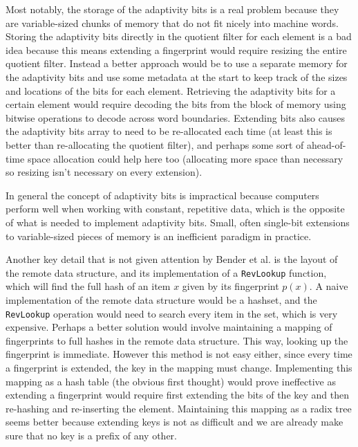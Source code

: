 \documentclass[../paper.tex]{subfiles}
\begin{document}
Most notably, the storage of the adaptivity bits is a real problem
because they are variable-sized chunks of memory that
do not fit nicely into machine words. Storing the adaptivity
bits directly in the quotient filter for each element is a bad idea
because this means extending a fingerprint would require resizing
the entire quotient filter. Instead a better approach would be
to use a separate memory for the adaptivity bits and use some metadata
at the start to keep track of the sizes and locations of the bits for each element. Retrieving
the adaptivity bits for a certain element would require decoding the bits
from the block of memory using bitwise operations to decode across word boundaries.
Extending bits also causes the adaptivity bits array to need to be re-allocated
each time (at least this is better than re-allocating the quotient filter), and
perhaps some sort of ahead-of-time space allocation could help here too (allocating more space than
necessary so resizing isn't necessary on every extension).

In general the concept of adaptivity bits is impractical because computers perform
well when working with constant, repetitive data, which is the opposite
of what is needed to implement adaptivity bits. Small, often single-bit
extensions to variable-sized pieces of memory is an inefficient paradigm
in practice.

Another key detail that is not given attention by Bender et al. is the layout
of the remote data structure, and its implementation of a \texttt{RevLookup}
function, which will find the full hash of an item $x$ given by its fingerprint
$p(x)$. A naive implementation of the remote data structure would be a hashset,
and the \texttt{RevLookup} operation would need to search every item in the
set, which is very expensive. Perhaps a better solution would involve maintaining
a mapping of fingerprints to full hashes in the remote data structure. This
way, looking up the fingerprint is immediate. However this method is not easy
either, since every time a fingerprint is extended, the key in the mapping must change.
Implementing this mapping as a hash table (the obvious first thought) would prove
ineffective as extending a fingerprint would require first extending the bits of
the key and then re-hashing and re-inserting the element. Maintaining this mapping
as a radix tree seems better because extending keys is not as difficult and
we are already make sure that no key is a prefix of any other.
\end{document}
